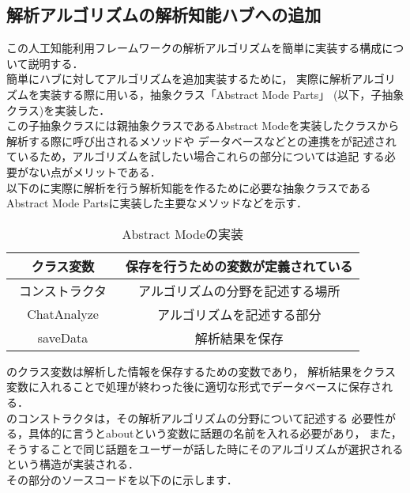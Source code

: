 
\subsection{解析アルゴリズムの解析知能ハブへの追加}
この人工知能利用フレームワークの解析アルゴリズムを簡単に実装する構成について説明する．\\

簡単にハブに対してアルゴリズムを追加実装するために，
実際に解析アルゴリズムを実装する際に用いる，抽象クラス「Abstract Mode Parts」
(以下，子抽象クラス)を実装した．\\

この子抽象クラスには親抽象クラスであるAbstract Modeを実装したクラスから解析する際に呼び出されるメソッドや
データベースなどとの連携をが記述されているため，アルゴリズムを試したい場合これらの部分については追記
する必要がない点がメリットである．\\

以下のに実際に解析を行う解析知能を作るために必要な抽象クラスである
Abstract Mode Partsに実装した主要なメソッドなどを示す．
\begin{table}[tbh]
	\caption{Abstract Modeの実装} \label{tab:Abstract Mode Parts}
	\begin{center}
		\begin{tabular}[htb]{c|c}
		\hline
		クラス変数 & 保存を行うための変数が定義されている \\ \hline
		コンストラクタ　& アルゴリズムの分野を記述する場所 \\ \hline
		ChatAnalyze & アルゴリズムを記述する部分 \\ \hline
		saveData & 解析結果を保存 \\ \hline
		\end{tabular}
	\end{center}
\end{table}

のクラス変数は解析した情報を保存するための変数であり，
解析結果をクラス変数に入れることで処理が終わった後に適切な形式でデータベースに保存される．
\\

のコンストラクタは，その解析アルゴリズムの分野について記述する
必要性がる，具体的に言うとaboutという変数に話題の名前を入れる必要があり，
また，そうすることで同じ話題をユーザーが話した時にそのアルゴリズムが選択されるという構造が実装される．
\\
その部分のソースコードを以下のに示します．

